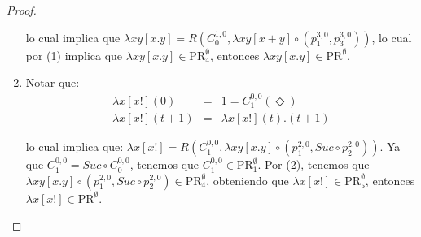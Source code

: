 \begin{proof}
\begin{enumerate}
        \par lo cual implica que $\lambda xy \left[x.y\right] = R(C_{0}^{1,0}, \lambda xy \left[x+y\right] \circ
        (p_{1}^{3,0}, p_{3}^{3,0}))$, lo cual por (1) implica que $\lambda xy \left[x.y\right] \in
        \mathrm{PR}_{4}^{\emptyset}$, entonces $\lambda xy \left[x.y\right] \in \mathrm{PR}^{\emptyset}$.
      \item Notar que:
        \begin{eqnarray}
          \nonumber \lambda x \left[x!\right](0) &=& 1 = C_{1}^{0,0}(\Diamond) \\
          \nonumber \lambda x \left[x!\right](t+1) &=& \lambda x \left[x!\right](t).(t+1)
        \end{eqnarray}

        \par lo cual implica que: $\lambda x \left[x!\right] = R(C_{1}^{0, 0}, \lambda xy \left[x.y\right] \circ
        (p_{1}^{2,0}, Suc \circ p_{2}^{2,0}))$. Ya que $C_{1}^{0,0} = Suc \circ C_{0}^{0,0}$, tenemos que $C_{1}^{0,0}
        \in \mathrm{PR}_{1}^{\emptyset}$. Por (2), tenemos que $\lambda xy \left[x.y\right] \circ (p_{1}^{2,0}, Suc
        \circ p_{2}^{2,0}) \in \mathrm{PR}_{4}^{\emptyset}$, obteniendo que $\lambda x \left[x!\right] \in
        \mathrm{PR}_{5}^{\emptyset}$, entonces $\lambda x \left[x!\right] \in \mathrm{PR}^{\emptyset}$.
    \end{enumerate}
  \end{proof}

